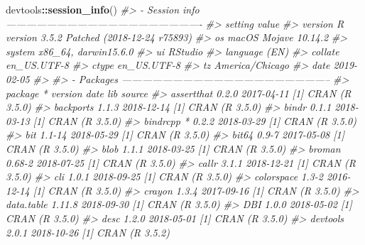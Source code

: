 \documentclass[oneside]{book}
\newenvironment{Shaded}{\begin{snugshade}}{\end{snugshade}}
\newcommand{\CommentTok}[1]{\textcolor[rgb]{0.56,0.35,0.01}{\textit{#1}}}
\newcommand{\KeywordTok}[1]{\textcolor[rgb]{0.13,0.29,0.53}{\textbf{#1}}}
\newcommand{\NormalTok}[1]{#1}
\newcommand{\OperatorTok}[1]{\textcolor[rgb]{0.81,0.36,0.00}{\textbf{#1}}}
\begin{document}
\begin{Shaded}
\begin{Highlighting}[]
\NormalTok{devtools}\OperatorTok{::}\KeywordTok{session_info}\NormalTok{()}
\CommentTok{#> - Session info ----------------------------------------------------------}
\CommentTok{#>  setting  value                                      }
\CommentTok{#>  version  R version 3.5.2 Patched (2018-12-24 r75893)}
\CommentTok{#>  os       macOS Mojave 10.14.2                       }
\CommentTok{#>  system   x86_64, darwin15.6.0                       }
\CommentTok{#>  ui       RStudio                                    }
\CommentTok{#>  language (EN)                                       }
\CommentTok{#>  collate  en_US.UTF-8                                }
\CommentTok{#>  ctype    en_US.UTF-8                                }
\CommentTok{#>  tz       America/Chicago                            }
\CommentTok{#>  date     2019-02-05                                 }
\CommentTok{#> }
\CommentTok{#> - Packages --------------------------------------------------------------}
\CommentTok{#>  package     * version    date       lib source                           }
\CommentTok{#>  assertthat    0.2.0      2017-04-11 [1] CRAN (R 3.5.0)                   }
\CommentTok{#>  backports     1.1.3      2018-12-14 [1] CRAN (R 3.5.0)                   }
\CommentTok{#>  bindr         0.1.1      2018-03-13 [1] CRAN (R 3.5.0)                   }
\CommentTok{#>  bindrcpp    * 0.2.2      2018-03-29 [1] CRAN (R 3.5.0)                   }
\CommentTok{#>  bit           1.1-14     2018-05-29 [1] CRAN (R 3.5.0)                   }
\CommentTok{#>  bit64         0.9-7      2017-05-08 [1] CRAN (R 3.5.0)                   }
\CommentTok{#>  blob          1.1.1      2018-03-25 [1] CRAN (R 3.5.0)                   }
\CommentTok{#>  broman        0.68-2     2018-07-25 [1] CRAN (R 3.5.0)                   }
\CommentTok{#>  callr         3.1.1      2018-12-21 [1] CRAN (R 3.5.0)                   }
\CommentTok{#>  cli           1.0.1      2018-09-25 [1] CRAN (R 3.5.0)                   }
\CommentTok{#>  colorspace    1.3-2      2016-12-14 [1] CRAN (R 3.5.0)                   }
\CommentTok{#>  crayon        1.3.4      2017-09-16 [1] CRAN (R 3.5.0)                   }
\CommentTok{#>  data.table    1.11.8     2018-09-30 [1] CRAN (R 3.5.0)                   }
\CommentTok{#>  DBI           1.0.0      2018-05-02 [1] CRAN (R 3.5.0)                   }
\CommentTok{#>  desc          1.2.0      2018-05-01 [1] CRAN (R 3.5.0)                   }
\CommentTok{#>  devtools      2.0.1      2018-10-26 [1] CRAN (R 3.5.2)                   }

\end{Highlighting}
\end{Shaded}
\end{document}
